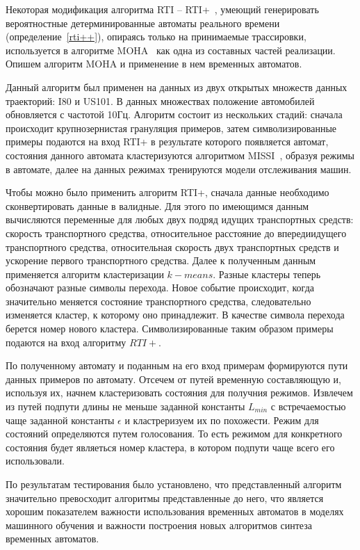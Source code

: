 \documentclass[times,specification,annotation]{itmo-student-thesis}
\begin{document}
Некоторая модификация алгоритма RTI -- RTI+~\cite{rti-plus}, умеющий генерировать вероятностные детерминированные автоматы реального времени (определение~\ref{rti++}),
опираясь только на принимаемые трассировки, используется в алгоритме MOHA~\cite{moha} как одна из составных частей реализации. Опишем алгоритм MOHA и применение в нем временных автоматов.

Данный алгоритм был применен на данных из двух открытых множеств данных траекторий: I80 и US101. В данных множествах положение автомобилей обновляется с частотой 10Гц.
Алгоритм состоит из нескольких стадий: сначала происходит крупнозернистая грануляция примеров, затем символизированные примеры подаются на вход RTI+ в результате которого
появляется автомат, состояния данного автомата кластеризуются алгоритмом MISSI~\cite{moha}, образуя режимы в автомате, далее на данных режимах тренируются модели отслеживания
машин.

Чтобы можно было применить алгоритм RTI+, сначала данные необходимо сконвертировать данные в валидные. Для этого по имеющимся данным вычисляются переменные для любых
двух подряд идущих транспортных средств: скорость транспортного средства, относительное расстояние до впередиидущего транспортного средства, относительная скорость двух транспортных
средств и ускорение первого транспортного средства. Далее к полученным данным применяется алгоритм кластеризации $k-means$. Разные кластеры теперь обозначают разные символы перехода.
Новое событие происходит, когда значительно меняется состояние транспортного средства, следовательно изменяется кластер, к которому оно принадлежит. В качестве символа перехода берется номер
нового кластера. Символизированные таким образом примеры подаются на вход алгоритму $RTI+$.

По полученному автомату и поданным на его вход примерам формируются пути данных примеров по автомату. Отсечем от путей временную составляющую и, используя их, начнем кластеризовать состояния
для получния режимов. Извлечем из путей подпути длины не меньше заданной константы $L_{min}$ с встречаемостью чаще заданной константы $\epsilon$ и кластреризуем их по похожести. Режим для
состояний определяются путем голосования. То есть режимом для конкретного состояния будет являеться номер кластера, в котором подпути чаще всего его использовали.

По результатам тестирования было установлено, что представленный алгоритм значительно превосходит алгоритмы представленные до него, что является хорошим показателем важности
использования временных автоматов в моделях машинного обучения и важности построения новых алгоритмов синтеза временных автоматов.
\end{document}
